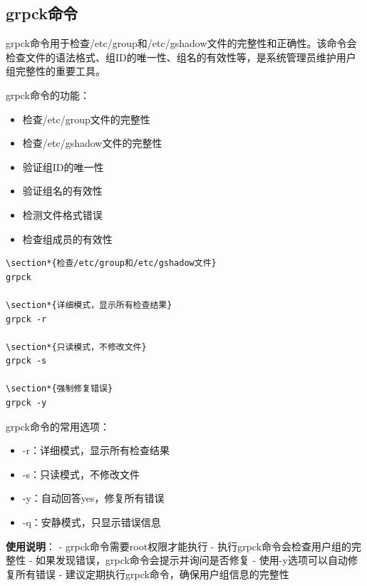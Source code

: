 \documentclass[12pt,UTF8]{ctexbook}
\begin{document}
\subsection{grpck命令}
grpck命令用于检查/etc/group和/etc/gshadow文件的完整性和正确性。该命令会检查文件的语法格式、组ID的唯一性、组名的有效性等，是系统管理员维护用户组完整性的重要工具。

grpck命令的功能：
\begin{itemize}
    \item 检查/etc/group文件的完整性
    \item 检查/etc/gshadow文件的完整性
    \item 验证组ID的唯一性
    \item 验证组名的有效性
    \item 检测文件格式错误
    \item 检查组成员的有效性
\end{itemize}

\begin{verbatim}
\section*{检查/etc/group和/etc/gshadow文件}
grpck

\section*{详细模式，显示所有检查结果}
grpck -r

\section*{只读模式，不修改文件}
grpck -s

\section*{强制修复错误}
grpck -y
\end{verbatim}

grpck命令的常用选项：
\begin{itemize}
    \item -r：详细模式，显示所有检查结果
    \item -s：只读模式，不修改文件
    \item -y：自动回答yes，修复所有错误
    \item -q：安静模式，只显示错误信息
\end{itemize}

\textbf{使用说明}：
- grpck命令需要root权限才能执行
- 执行grpck命令会检查用户组的完整性
- 如果发现错误，grpck命令会提示并询问是否修复
- 使用-y选项可以自动修复所有错误
- 建议定期执行grpck命令，确保用户组信息的完整性
\end{document}
